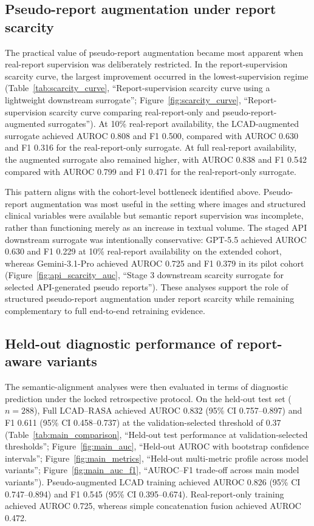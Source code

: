 \subsection{Pseudo-report augmentation under report scarcity}
\label{subsec:scarcity_results}

The practical value of pseudo-report augmentation became most apparent when real-report supervision was deliberately restricted. In the report-supervision scarcity curve, the largest improvement occurred in the lowest-supervision regime (Table~\ref{tab:scarcity_curve}, ``Report-supervision scarcity curve using a lightweight downstream surrogate''; Figure~\ref{fig:scarcity_curve}, ``Report-supervision scarcity curve comparing real-report-only and pseudo-report-augmented surrogates''). At 10\% real-report availability, the LCAD-augmented surrogate achieved AUROC 0.808 and F1 0.500, compared with AUROC 0.630 and F1 0.316 for the real-report-only surrogate. At full real-report availability, the augmented surrogate also remained higher, with AUROC 0.838 and F1 0.542 compared with AUROC 0.799 and F1 0.471 for the real-report-only surrogate.

This pattern aligns with the cohort-level bottleneck identified above. Pseudo-report augmentation was most useful in the setting where images and structured clinical variables were available but semantic report supervision was incomplete, rather than functioning merely as an increase in textual volume. The staged API downstream surrogate was intentionally conservative: GPT-5.5 achieved AUROC 0.630 and F1 0.229 at 10\% real-report availability on the extended cohort, whereas Gemini-3.1-Pro achieved AUROC 0.725 and F1 0.379 in its pilot cohort (Figure~\ref{fig:api_scarcity_auc}, ``Stage 3 downstream scarcity surrogate for selected API-generated pseudo reports''). These analyses support the role of structured pseudo-report augmentation under report scarcity while remaining complementary to full end-to-end retraining evidence.

\subsection{Held-out diagnostic performance of report-aware variants}
\label{subsec:diagnostic_results}

The semantic-alignment analyses were then evaluated in terms of diagnostic prediction under the locked retrospective protocol. On the held-out test set ($n=288$), Full LCAD--RASA achieved AUROC 0.832 (95\% CI 0.757--0.897) and F1 0.611 (95\% CI 0.458--0.737) at the validation-selected threshold of 0.37 (Table~\ref{tab:main_comparison}, ``Held-out test performance at validation-selected thresholds''; Figure~\ref{fig:main_auc}, ``Held-out AUROC with bootstrap confidence intervals''; Figure~\ref{fig:main_metrics}, ``Held-out multi-metric profile across model variants''; Figure~\ref{fig:main_auc_f1}, ``AUROC--F1 trade-off across main model variants''). Pseudo-augmented LCAD training achieved AUROC 0.826 (95\% CI 0.747--0.894) and F1 0.545 (95\% CI 0.395--0.674). Real-report-only training achieved AUROC 0.725, whereas simple concatenation fusion achieved AUROC 0.472.

